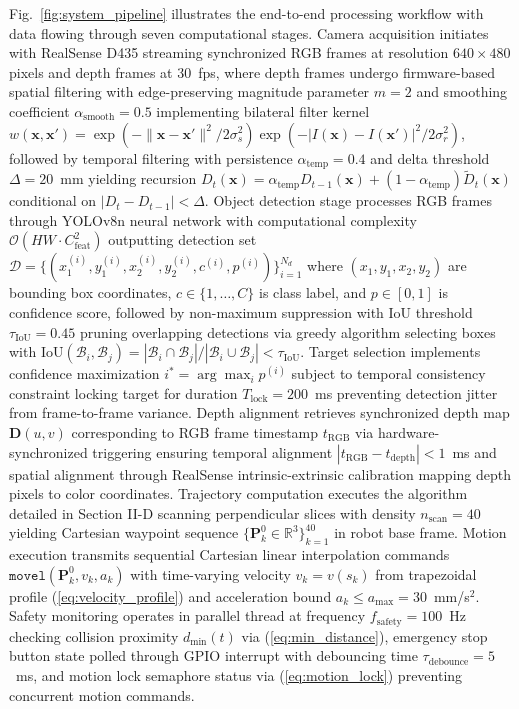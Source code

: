 \documentclass[journal]{IEEEtran}
\begin{document}
Fig.~\ref{fig:system_pipeline} illustrates the end-to-end processing workflow with data flowing through seven computational stages. Camera acquisition initiates with RealSense D435 streaming synchronized RGB frames at resolution $640 \times 480$ pixels and depth frames at 30~fps, where depth frames undergo firmware-based spatial filtering with edge-preserving magnitude parameter $m = 2$ and smoothing coefficient $\alpha_{\text{smooth}} = 0.5$ implementing bilateral filter kernel $w(\mathbf{x}, \mathbf{x}') = \exp(-\|\mathbf{x} - \mathbf{x}'\|^2 / 2\sigma_s^2) \exp(-|I(\mathbf{x}) - I(\mathbf{x}')|^2 / 2\sigma_r^2)$, followed by temporal filtering with persistence $\alpha_{\text{temp}} = 0.4$ and delta threshold $\Delta = 20$~mm yielding recursion $D_t(\mathbf{x}) = \alpha_{\text{temp}} D_{t-1}(\mathbf{x}) + (1-\alpha_{\text{temp}}) \tilde{D}_t(\mathbf{x})$ conditional on $|D_t - D_{t-1}| < \Delta$. Object detection stage processes RGB frames through YOLOv8n neural network with computational complexity $\mathcal{O}(HW \cdot C_{\text{feat}}^2)$ outputting detection set $\mathcal{D} = \{(x_1^{(i)}, y_1^{(i)}, x_2^{(i)}, y_2^{(i)}, c^{(i)}, p^{(i)})\}_{i=1}^{N_d}$ where $(x_1, y_1, x_2, y_2)$ are bounding box coordinates, $c \in \{1, \ldots, C\}$ is class label, and $p \in [0,1]$ is confidence score, followed by non-maximum suppression with IoU threshold $\tau_{\text{IoU}} = 0.45$ pruning overlapping detections via greedy algorithm selecting boxes with $\text{IoU}(\mathcal{B}_i, \mathcal{B}_j) = |\mathcal{B}_i \cap \mathcal{B}_j| / |\mathcal{B}_i \cup \mathcal{B}_j| < \tau_{\text{IoU}}$. Target selection implements confidence maximization $i^* = \arg\max_{i} p^{(i)}$ subject to temporal consistency constraint locking target for duration $T_{\text{lock}} = 200$~ms preventing detection jitter from frame-to-frame variance. Depth alignment retrieves synchronized depth map $\mathbf{D}(u,v)$ corresponding to RGB frame timestamp $t_{\text{RGB}}$ via hardware-synchronized triggering ensuring temporal alignment $|t_{\text{RGB}} - t_{\text{depth}}| < 1$~ms and spatial alignment through RealSense intrinsic-extrinsic calibration mapping depth pixels to color coordinates. Trajectory computation executes the algorithm detailed in Section II-D scanning perpendicular slices with density $n_{\text{scan}} = 40$ yielding Cartesian waypoint sequence $\{\boldsymbol{P}_k^{0} \in \mathbb{R}^3\}_{k=1}^{40}$ in robot base frame. Motion execution transmits sequential Cartesian linear interpolation commands $\texttt{movel}(\boldsymbol{P}_k^{0}, v_k, a_k)$ with time-varying velocity $v_k = v(s_k)$ from trapezoidal profile (\ref{eq:velocity_profile}) and acceleration bound $a_k \leq a_{\max} = 30$~mm/s$^2$. Safety monitoring operates in parallel thread at frequency $f_{\text{safety}} = 100$~Hz checking collision proximity $d_{\min}(t)$ via (\ref{eq:min_distance}), emergency stop button state polled through GPIO interrupt with debouncing time $\tau_{\text{debounce}} = 5$~ms, and motion lock semaphore status via (\ref{eq:motion_lock}) preventing concurrent motion commands.
\end{document}
